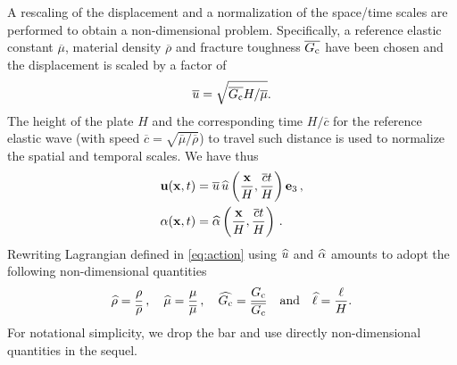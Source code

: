 A rescaling of the displacement and a normalization of the space/time scales are performed to obtain a non-dimensional problem. Specifically, a reference elastic constant $\overline{\mu}$, material density $\overline{\rho}$ and fracture toughness $\overline{G_\mathrm{c}}$ have been chosen and the displacement is scaled by a factor of
\[
\overline{u}=\sqrt{\overline{G_\mathrm{c}}H/\overline{\mu}}.
\]
The height of the plate $H$ and the corresponding time $H/\overline{c}$ for the reference elastic wave (with speed $\overline{c}=\sqrt{\overline{\mu}/\overline{\rho}}$) to travel such distance is used to normalize the spatial and temporal scales. We have thus
\begin{align*}
\vec{u}(\vec{x},t) &= \overline{u}\,\uhat\left(\frac{\vec{x}}{H},\frac{\overline{c}t}{H}\right)\vec{e}_3\,, \\
\alpha(\vec{x},t) &= \ahat\left(\frac{\vec{x}}{H},\frac{\overline{c}t}{H}\right)\,.
\end{align*}
Rewriting Lagrangian defined in \eqref{eq:action} using $\widehat{u}$ and $\widehat{\alpha}$ amounts to adopt the following non-dimensional quantities
\[
\widehat{\rho}=\frac{\rho}{\overline{\rho}}\,,\quad \widehat{\mu}=\frac{\mu}{\overline{\mu}}\,,\quad \widehat{G_\mathrm{c}}=\frac{G_\mathrm{c}}{\overline{G_\mathrm{c}}}\quad\text{and}\quad\widehat{\ell}=\frac{\ell}{H}.
\]
For notational simplicity, we drop the bar and use directly non-dimensional quantities in the sequel.

